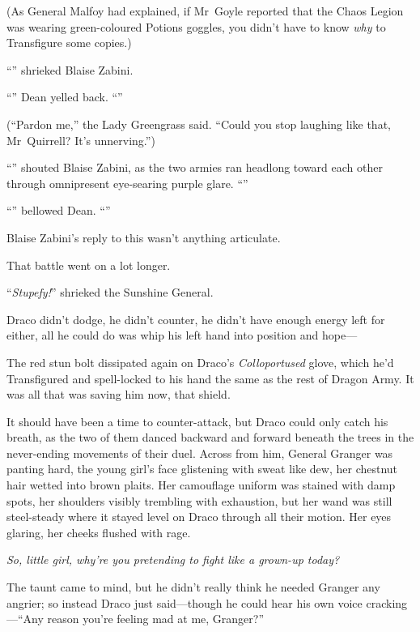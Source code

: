 (As General Malfoy had explained, if Mr~Goyle reported that the Chaos Legion was wearing green-coloured Potions goggles, you didn’t have to know \emph{why} to Transfigure some copies.)

“” shrieked Blaise Zabini.

“” Dean yelled back. “”

(“Pardon me,” the Lady Greengrass said. “Could you stop laughing like that, Mr~Quirrell? It’s unnerving.”)

“” shouted Blaise Zabini, as the two armies ran headlong toward each other through omnipresent eye-searing purple glare. “”

“” bellowed Dean. “”

Blaise Zabini’s reply to this wasn’t anything articulate.

That battle went on a lot longer.

\later

“\emph{Stupefy!}” shrieked the Sunshine General.

Draco didn’t dodge, he didn’t counter, he didn’t have enough energy left for either, all he could do was whip his left hand into position and hope—

The red stun bolt dissipated again on Draco’s \emph{Colloportused} glove, which he’d Transfigured and spell-locked to his hand the same as the rest of Dragon Army. It was all that was saving him now, that shield.

It should have been a time to counter-attack, but Draco could only catch his breath, as the two of them danced backward and forward beneath the trees in the never-ending movements of their duel. Across from him, General Granger was panting hard, the young girl’s face glistening with sweat like dew, her chestnut hair wetted into brown plaits. Her camouflage uniform was stained with damp spots, her shoulders visibly trembling with exhaustion, but her wand was still steel-steady where it stayed level on Draco through all their motion. Her eyes glaring, her cheeks flushed with rage.

\emph{So, little girl, why’re you pretending to fight like a grown-up today?}

The taunt came to mind, but he didn’t really think he needed Granger any angrier; so instead Draco just said—though he could hear his own voice cracking—“Any reason you’re feeling mad at me, Granger?”

